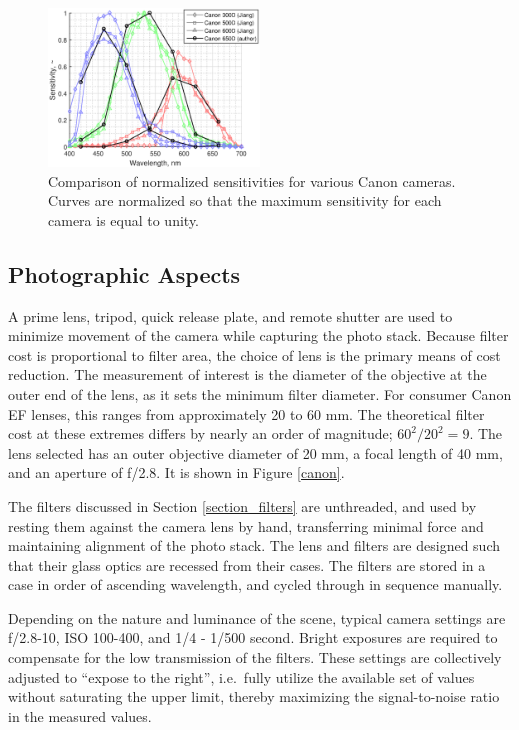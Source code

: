 \documentclass[twocolumn,10pt]{asme2ej}
\newcommand{\id}{\hspace{6 mm}}
\begin{document}
\begin{figure}
\centering
\includegraphics[width=0.5\textwidth]{camera_spectral_sensitivities.eps}
\caption{Comparison of normalized sensitivities for various Canon cameras. \cite{Jiang} Curves are normalized so that the maximum sensitivity for each camera is equal to unity.}
\label{camera_spectral_sensitivities}
\end{figure}

\subsection{Photographic Aspects}
\label{photographic}

A prime lens, tripod, quick release plate, and remote shutter are used to minimize movement of the camera while capturing the photo stack. Because filter cost is proportional to filter area, the choice of lens is the primary means of cost reduction. The measurement of interest is the diameter of the objective at the outer end of the lens, as it sets the minimum filter diameter. For consumer Canon EF lenses, this ranges from approximately 20 to 60 mm. The theoretical filter cost at these extremes differs by nearly an order of magnitude; $60^2 / 20^2 = 9$. The lens selected has an outer objective diameter of 20 mm, a focal length of 40 mm, and an aperture of f/2.8. It is shown in Figure \ref{canon}.

\id The filters discussed in Section \ref{section_filters} are unthreaded, and used by resting them against the camera lens by hand, transferring minimal force and maintaining alignment of the photo stack. The lens and filters are designed such that their glass optics are recessed from their cases. The filters are stored in a case in order of ascending wavelength, and cycled through in sequence manually.

\id Depending on the nature and luminance of the scene, typical camera settings are f/2.8-10, ISO 100-400, and 1/4 - 1/500 second. Bright exposures are required to compensate for the low transmission of the filters. These settings are collectively adjusted to ``expose to the right'', i.e.\ fully utilize the available set of values without saturating the upper limit, thereby maximizing the signal-to-noise ratio in the measured values.
\end{document}
